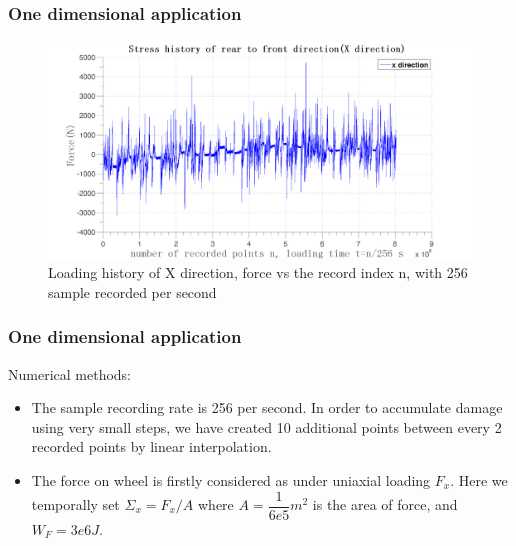 \documentclass[xcolor=table]{Bredelebeamer}
\begin{document}
\begin{frame}
	\frametitle{One dimensional application}
\begin{figure}[!h]
	\centering
	\includegraphics[width=\textwidth]{figures//x.png} 
	\caption{Loading history of X direction, force vs the record index n, with 256 sample recorded per second}
	\label{x}
\end{figure}
\end{frame}	

\begin{frame}
	\frametitle{One dimensional application}
 	\begin{block}{Numerical methods:}

			\begin{itemize}
				\item 	The sample recording rate is 256 per second. In order to accumulate damage using very small steps, we have created 10 additional points between every 2 recorded points by linear interpolation.
				\vspace{6pt}
				\item The force on wheel is firstly considered as under uniaxial loading $F_x$. Here we temporally set $\Sigma_x=F_x/A$ where $A=\dfrac{1}{6e5} m^2$ is the area of force, and $W_F=3e6 J$. 
		\end{itemize}
 
	\end{block}
\end{frame}	
\end{document}
